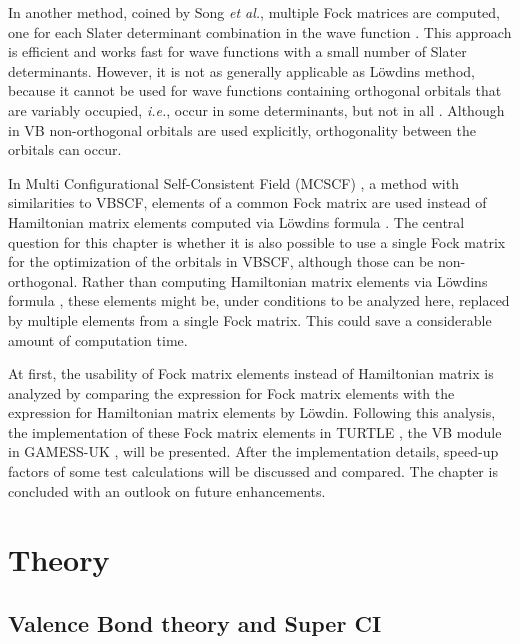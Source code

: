 In another method, coined by Song \textit{et al.}, multiple Fock matrices are computed, one for each Slater determinant combination in the wave function \cite{song}. This approach is efficient and works fast for wave functions with a small number of Slater determinants. However, it is not as generally applicable as L\"{o}wdins method, because it cannot be used for wave functions containing orthogonal orbitals that are variably occupied, \textit{i.e.}, occur in some determinants, but not in all \cite{xmvb}. Although in VB non-orthogonal orbitals are used explicitly, orthogonality between the orbitals can occur.

In Multi Configurational Self-Consistent Field (MCSCF) \cite{joop,mcscf,roos1,roos2}, a method with similarities to VBSCF, elements of a common Fock matrix are used instead of Hamiltonian matrix elements computed via L\"{o}wdins formula \cite{roos1}. The central question for this chapter is whether it is also possible to use a single Fock matrix for the optimization of the orbitals in VBSCF, although those can be non-orthogonal. Rather than computing Hamiltonian matrix elements via L\"{o}wdins formula \cite{koos3}, these elements might be, under conditions to be analyzed here, replaced by multiple elements from a single Fock matrix. This could save a considerable amount of computation time.

At first, the usability of Fock matrix elements instead of Hamiltonian matrix is analyzed by comparing the expression for Fock matrix elements with the expression for Hamiltonian matrix elements by L\"{o}wdin. Following this analysis, the implementation of these Fock matrix elements in TURTLE \cite{turtle}, the VB module in GAMESS-UK \cite{gamess}, will be presented. After the implementation details, speed-up factors of some test calculations will be discussed and compared. The chapter is concluded with an outlook on future enhancements.  

\section{Theory}

\subsection{\label{ch2.sec.vbsci}Valence Bond theory and Super CI}

